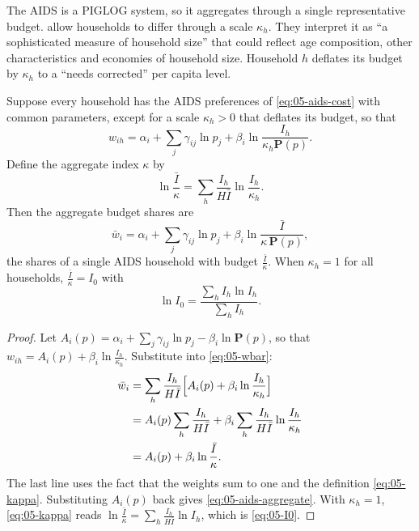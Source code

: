 The AIDS is a PIGLOG system, so it aggregates through a single representative budget.
\citet[Section~I.A]{DeatonMuellbauer1980a} allow households to differ through a scale $\kappa_h$. They
interpret it as ``a sophisticated measure of household size'' that could reflect age composition, other
characteristics and economies of household size. Household $h$ deflates its budget by $\kappa_h$ to a
``needs corrected'' per capita level.

\begin{proposition}\label{prop:05-almost-exact}
Suppose every household has the AIDS preferences of \eqref{eq:05-aids-cost} with common parameters, except
for a scale $\kappa_h > 0$ that deflates its budget, so that
\begin{equation}\label{eq:05-aids-household}
  w_{ih} = \alpha_i + \sum_j \gamma_{ij}\ln p_j + \beta_i \ln\frac{I_h}{\kappa_h \mathbf{P}(p)} .
\end{equation}
Define the aggregate index $\kappa$ by
\begin{equation}\label{eq:05-kappa}
  \ln\frac{\bar I}{\kappa} = \sum_h \frac{I_h}{H\bar I}\ln\frac{I_h}{\kappa_h}.
\end{equation}
Then the aggregate budget shares are
\begin{equation}\label{eq:05-aids-aggregate}
  \bar w_i = \alpha_i + \sum_j \gamma_{ij}\ln p_j + \beta_i \ln\frac{\bar I}{\kappa\, \mathbf{P}(p)} ,
\end{equation}
the shares of a single AIDS household with budget $\frac{\bar I}{\kappa}$. When $\kappa_h = 1$ for all
households, $\frac{\bar I}{\kappa} = I_0$ with
\begin{equation}\label{eq:05-I0}
  \ln I_0 = \frac{\sum_h I_h \ln I_h}{\sum_h I_h} .
\end{equation}
\end{proposition}

\begin{proof}
Let $A_i(p) = \alpha_i + \sum_j\gamma_{ij}\ln p_j - \beta_i\ln\mathbf{P}(p)$, so that $w_{ih} = A_i(p) +
\beta_i\ln\frac{I_h}{\kappa_h}$. Substitute into \eqref{eq:05-wbar}:
\begin{align*}
  \bar w_i &= \sum_h \frac{I_h}{H\bar I}\Bigl[A_i(p) + \beta_i\ln\frac{I_h}{\kappa_h}\Bigr] \\
           &= A_i(p)\sum_h \frac{I_h}{H\bar I} + \beta_i \sum_h \frac{I_h}{H\bar I}\ln\frac{I_h}{\kappa_h} \\
           &= A_i(p) + \beta_i\ln\frac{\bar I}{\kappa} .
\end{align*}
The last line uses the fact that the weights sum to one and the definition \eqref{eq:05-kappa}.
Substituting $A_i(p)$ back gives \eqref{eq:05-aids-aggregate}. With $\kappa_h = 1$, \eqref{eq:05-kappa}
reads $\ln\frac{\bar I}{\kappa} = \sum_h \frac{I_h}{H\bar I}\ln I_h$, which is \eqref{eq:05-I0}.
\end{proof}

